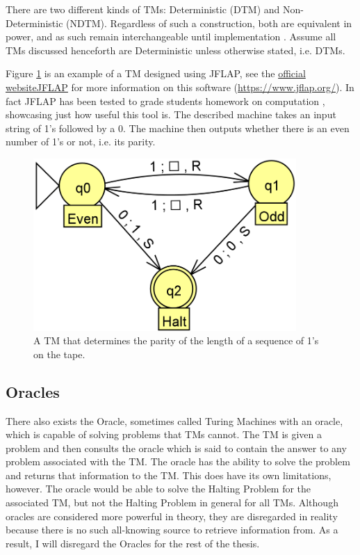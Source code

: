 There are two different kinds of TMs: Deterministic (DTM) and Non-Deterministic (NDTM).
Regardless of such a construction, both are equivalent in power, and as such remain interchangeable until implementation \cite{NDTMeqDTM}.
Assume all TMs discussed henceforth are Deterministic unless otherwise stated, i.e. DTMs.

Figure \ref{fig:TM} is an example of a TM designed using JFLAP, see the \href{https://www.jflap.org/}{official websiteJFLAP} for more information on this software (\href{https://www.jflap.org/}{https://www.jflap.org/}).
In fact JFLAP has been tested to grade students homework on computation \cite{JFLAPGrading}, showcasing just how useful this tool is.
The described machine takes an input string of 1's followed by a 0.
The machine then outputs whether there is an even number of 1's or not, i.e. its parity.

\begin{figure}[htb]
    \centering
    \includegraphics[width=10cm]{Images/SampleTMCrop.png}
       \caption{A TM that determines the parity of the length of a sequence of 1's on the tape.}
           \label{fig:TM}
\end{figure}

\subsection{Oracles}\label{subsec:Oracles}

There also exists the Oracle, sometimes called Turing Machines with an oracle, which is capable of solving problems that TMs cannot.
The TM is given a problem and then consults the oracle which is said to contain the answer to any problem associated with the TM.
The oracle has the ability to solve the problem and returns that information to the TM.
This does have its own limitations, however.
The oracle would be able to solve the Halting Problem for the associated TM, but not the Halting Problem in general for all TMs.
Although oracles are considered more powerful in theory, they are disregarded in reality because there is no such all-knowing source to retrieve information from.
As a result, I will disregard the Oracles for the rest of the thesis.

